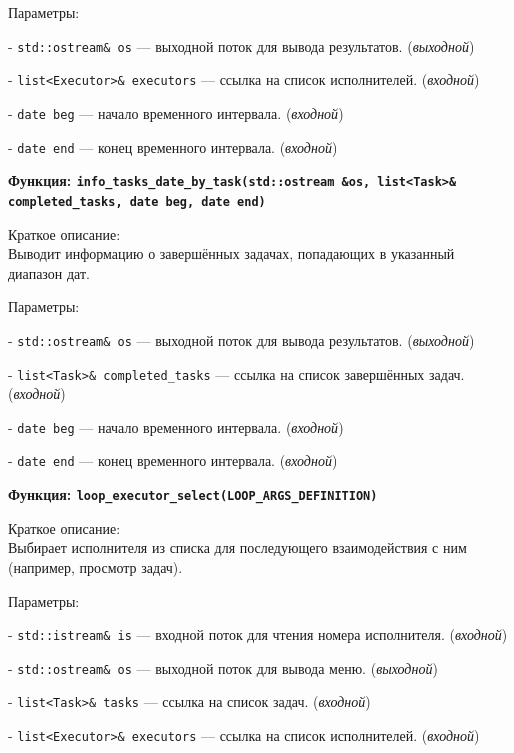 \documentclass[12pt,a4paper]{extarticle}
\begin{document}
Параметры:


- \texttt{std::ostream\& os} — выходной поток для вывода результатов. (\textit{выходной})

- \texttt{list<Executor>\& executors} — ссылка на список исполнителей. (\textit{входной})

- \texttt{date beg} — начало временного интервала. (\textit{входной})

- \texttt{date end} — конец временного интервала. (\textit{входной})

\begin{center}

    \textbf{Функция: \texttt{info\_tasks\_date\_by\_task(std::ostream \&os, list<Task>\& completed\_tasks, date beg, date end)}}
\end{center}

Краткое описание: \\
Выводит информацию о завершённых задачах, попадающих в указанный диапазон дат.

Параметры:


- \texttt{std::ostream\& os} — выходной поток для вывода результатов. (\textit{выходной})

- \texttt{list<Task>\& completed\_tasks} — ссылка на список завершённых задач. (\textit{входной})

- \texttt{date beg} — начало временного интервала. (\textit{входной})

- \texttt{date end} — конец временного интервала. (\textit{входной})

\begin{center}

    \textbf{Функция: \texttt{loop\_executor\_select(LOOP\_ARGS\_DEFINITION)}}
\end{center}

Краткое описание: \\
Выбирает исполнителя из списка для последующего взаимодействия с ним (например, просмотр задач).

Параметры:


- \texttt{std::istream\& is} — входной поток для чтения номера исполнителя. (\textit{входной})

- \texttt{std::ostream\& os} — выходной поток для вывода меню. (\textit{выходной})

- \texttt{list<Task>\& tasks} — ссылка на список задач. (\textit{входной})

- \texttt{list<Executor>\& executors} — ссылка на список исполнителей. (\textit{входной})
\end{document}
